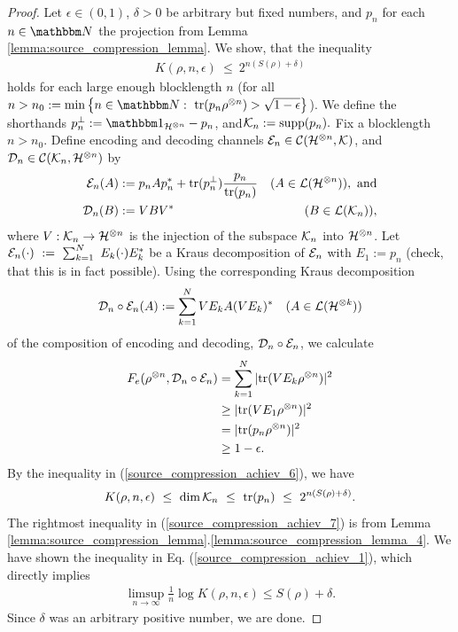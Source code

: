 \begin{proof}
 Let $\epsilon \in (0,1)$, $\delta > 0$ be arbitrary but fixed numbers, and $p_n$ for each $n \in \bbmN$ the projection from 
 Lemma \ref{lemma:source_compression_lemma}. We show, that the inequality
 \begin{align}
  K(\rho, n, \epsilon)  \ \leq \ 2^{n(S(\rho) + \delta)} \label{source_compression_achiev_1}
 \end{align}
 holds for each large enough blocklength $n$ (for all $n > n_0 := \min\left\{n \in \bbmN: \ \tr(p_n \rho^{\otimes n}) > \sqrt{1 -\epsilon} \right\}$).
 We define the shorthands
$
  p_n^{\perp} := \bbmeins_{\cH^{\otimes n}} - p_n$, and${\mathcal K}_n := \mathrm{supp}(p_n).
 $
 Fix a blocklength $n > n_0$. Define encoding and decoding channels ${\mathcal E}_n \in {\mathcal C}({\mathcal H}^{\otimes n}, {\mathcal K})$, and ${\mathcal D}_n \in {\mathcal C}({\mathcal K}_n, {\mathcal H}^{\otimes n})$ by 
 \begin{align*}
  {\mathcal E}_n(A) &:= p_n A p_n^\ast + \mathrm{tr}(p_n^{\perp}) \frac{p_n}{\mathrm{tr}(p_n)}   &(A \in {\mathcal L}({\mathcal H}^{\otimes n})), \ \text{and} \\
  {\mathcal D}_n(B) &:= VBV^\ast  & (B \in {\mathcal L}({\mathcal K}_n)),
 \end{align*}
  where $V: {\mathcal K}_n \rightarrow {\mathcal H}^{\otimes n}$ is the injection of the subspace ${\mathcal K}_n$ into ${\mathcal H}^{\otimes n}$. Let 
$
   {\mathcal E}_n(\cdot) \ := \ \sum_{k=1}^N \ E_k (\cdot) E_k^{\ast} 
 $
  be a Kraus decomposition of  ${\mathcal E}_n$ with $E_1 := p_n$ (check, that this is in fact possible). Using the corresponding Kraus decomposition 
  \begin{align*}
   {\mathcal D}_n \circ {\mathcal E}_n(A) := \sum_{k=1}^N VE_k A (VE_k)^{\ast}  &&(A \in {\mathcal L}({\mathcal H}^{\otimes k})) 
  \end{align*} 
   of the composition of encoding and decoding, ${\mathcal D}_n \circ {\mathcal E}_n$, we calculate
  \begin{align}
   F_e(\rho^{\otimes n}, {\mathcal D}_n \circ {\mathcal E}_n) 
   & = \sum_{k=1}^N |\mathrm{tr}(VE_k \rho^{\otimes n})|^2  \label{source_compression_achiev_3} \\
   & \geq |\mathrm{tr}(VE_1 \rho^{\otimes n})|^2 \nonumber  \nonumber \\
   & =  |\mathrm{tr}(p_{n} \rho^{\otimes n})|^2  \nonumber  \nonumber \\
   &\geq 1 - \epsilon.  \label{source_compression_achiev_6}
  \end{align}
  By the inequality in (\ref{source_compression_achiev_6}), we have
  \begin{align}
    K(\rho,n, \epsilon) \ \leq \  \dim \cK_n \ \leq \  \tr(p_n) \ \leq \ 2^{n(S(\rho) + \delta)}.  \label{source_compression_achiev_7}
   \end{align}
   The rightmost inequality in (\ref{source_compression_achiev_7}) is from Lemma \ref{lemma:source_compression_lemma}.\ref{lemma:source_compression_lemma_4}. 
   We have shown the inequality in Eq. (\ref{source_compression_achiev_1}), which directly implies 
   \begin{align*}
    \underset{n \rightarrow \infty}{\limsup} \frac{1}{n} \log K(\rho, n, \epsilon) \leq S(\rho) + \delta.
   \end{align*}
   Since $\delta$ was an arbitrary positive number, we are done. 
\end{proof}

